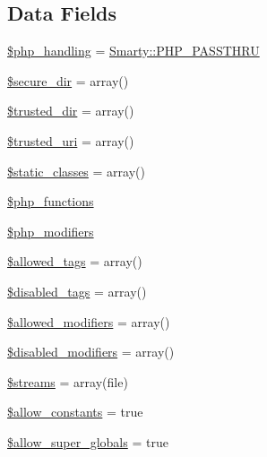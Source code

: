 \subsection*{Data Fields}
\begin{DoxyCompactItemize}
\item 
\hyperlink{class_smarty___security_abb37c3c6b2bcb9a527c4139bffb7e6ca}{\$php\+\_\+handling} = \hyperlink{class_smarty_a5ffae087be1c42146449529dcc03524f}{Smarty\+::\+P\+H\+P\+\_\+\+P\+A\+S\+S\+T\+H\+R\+U}
\item 
\hyperlink{class_smarty___security_a7694029b12fccde3ffae27a1d1d7b5be}{\$secure\+\_\+dir} = array()
\item 
\hyperlink{class_smarty___security_a4541edfa0e2dd6b0e4b1da10c14fa52c}{\$trusted\+\_\+dir} = array()
\item 
\hyperlink{class_smarty___security_acac0932b45462f6ec294170ba2398970}{\$trusted\+\_\+uri} = array()
\item 
\hyperlink{class_smarty___security_acceeada3b86f5ee9d7bef68b272d2aa3}{\$static\+\_\+classes} = array()
\item 
\hyperlink{class_smarty___security_ae18d58916b29bf6fb282992c68a966bc}{\$php\+\_\+functions}
\item 
\hyperlink{class_smarty___security_aef98f7874c2babd06275f77d62af7d1f}{\$php\+\_\+modifiers}
\item 
\hyperlink{class_smarty___security_a0beeeb8bad11f6da7b4d66e93de9b123}{\$allowed\+\_\+tags} = array()
\item 
\hyperlink{class_smarty___security_aff1c2833a6915a9a74ef13a4f57b2ecf}{\$disabled\+\_\+tags} = array()
\item 
\hyperlink{class_smarty___security_a216fbbb00b5f51a8b0d6e4b949112ac4}{\$allowed\+\_\+modifiers} = array()
\item 
\hyperlink{class_smarty___security_a2b05ea7f3d61015d28f4b60fd7aec870}{\$disabled\+\_\+modifiers} = array()
\item 
\hyperlink{class_smarty___security_acb5ee85532714639acc90fbe44a17f9e}{\$streams} = array(\textquotesingle{}file\textquotesingle{})
\item 
\hyperlink{class_smarty___security_af21890600774bbfb4eb4fb5598199c7c}{\$allow\+\_\+constants} = true
\item 
\hyperlink{class_smarty___security_a92167d53a3b46a8ff5a5839665082801}{\$allow\+\_\+super\+\_\+globals} = true
\end{DoxyCompactItemize}
